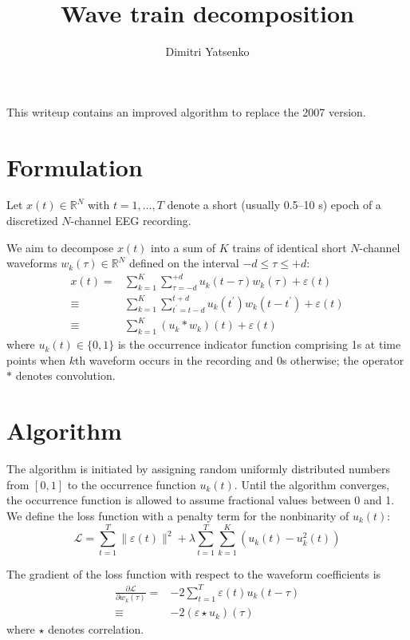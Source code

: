 \documentclass[10pt,twocolumn]{article}
\title{Wave train decomposition}
\author{Dimitri Yatsenko}
\newcommand{\R}{\mathbb R}
\begin{document}
\maketitle
This writeup contains an improved algorithm to replace the 2007 version. 

\section*{Formulation}
Let $x(t)\in \R^N$ with $t = 1,\ldots,T$ denote a short (usually 0.5--10 s) epoch of a discretized $N$-channel EEG recording.

We aim to decompose $x(t)$ into a sum of $K$ trains of identical short $N$-channel waveforms $w_k(\tau)\in \R^N$ defined on the interval $-d \le \tau \le +d$:
\begin{equation}
\begin{split}
x(t) = & 
\sum\limits_{k=1}^K \sum_{\tau=-d}^{+d} u_k(t-\tau)w_k(\tau) + \varepsilon(t)
\\
\equiv &
\sum\limits_{k=1}^K \sum_{t^\prime=t-d}^{t+d} u_k(t^\prime)w_k(t-t^\prime) + \varepsilon(t)
\\
\equiv &
\sum\limits_{k=1}^K (u_k*w_k)(t) + \varepsilon(t)
\end{split}
\end{equation}
where $u_k(t)\in \{0,1\}$ is the occurrence indicator function comprising 1s at time points when $k$th waveform occurs in the recording and 0s otherwise; the operator $*$ denotes convolution.

\section*{Algorithm}
The algorithm is initiated by assigning random uniformly distributed numbers from $[0,1]$ to the occurrence function $u_k(t)$. 
Until the algorithm converges, the occurrence function is allowed to assume fractional values between 0 and 1.
We define the loss function with a penalty term for the nonbinarity of $u_k(t)$:
\begin{equation}
\mathcal L = 
\sum\limits_{t=1}^T \|\varepsilon(t)\|^2 
+ \lambda\sum\limits_{t=1}^T \sum\limits_{k=1}^K (u_k(t)-u_k^2(t)) 
\end{equation}

The gradient of the loss function with respect to the waveform coefficients is 
\begin{equation}
\begin{split}
\frac{\partial \mathcal L}{\partial w_k(\tau)} 
= & -2\sum\limits_{t=1}^T \varepsilon(t) u_k(t-\tau)
\\
\equiv & -2 (\varepsilon\star u_k)(\tau)
\end{split}
\end{equation}
where $\star$ denotes correlation.
\end{document}
